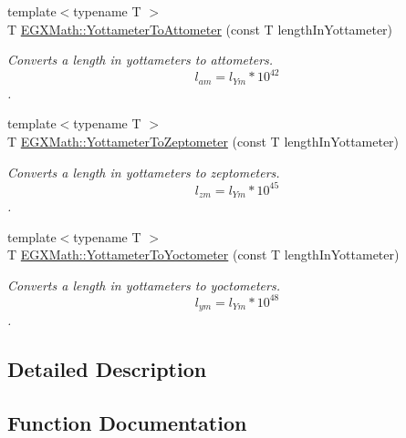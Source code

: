 \begin{DoxyCompactItemize}
{\footnotesize template$<$typename T $>$ }\\T \mbox{\hyperlink{group___e_g_x_math-_conversions-_length_conversions-_s_i-_yottameter-_s_i_gad04f66f8ca146161e2a36525bb887a5b}{E\+G\+X\+Math\+::\+Yottameter\+To\+Attometer}} (const T length\+In\+Yottameter)
\begin{DoxyCompactList}\small\item\em Converts a length in yottameters to attometers. \[ l_{am}=l_{Ym} * 10^{42} \]. \end{DoxyCompactList}\item 
{\footnotesize template$<$typename T $>$ }\\T \mbox{\hyperlink{group___e_g_x_math-_conversions-_length_conversions-_s_i-_yottameter-_s_i_ga976c591d436c20684f2d55461a05da3e}{E\+G\+X\+Math\+::\+Yottameter\+To\+Zeptometer}} (const T length\+In\+Yottameter)
\begin{DoxyCompactList}\small\item\em Converts a length in yottameters to zeptometers. \[ l_{zm}=l_{Ym} * 10^{45} \]. \end{DoxyCompactList}\item 
{\footnotesize template$<$typename T $>$ }\\T \mbox{\hyperlink{group___e_g_x_math-_conversions-_length_conversions-_s_i-_yottameter-_s_i_ga946a366f9c912aaa81ab052567f86bc2}{E\+G\+X\+Math\+::\+Yottameter\+To\+Yoctometer}} (const T length\+In\+Yottameter)
\begin{DoxyCompactList}\small\item\em Converts a length in yottameters to yoctometers. \[ l_{ym}=l_{Ym} * 10^{48} \]. \end{DoxyCompactList}\end{DoxyCompactItemize}


\subsection{Detailed Description}


\subsection{Function Documentation}
\mbox{\label{group___e_g_x_math-_conversions-_length_conversions-_s_i-_yottameter-_s_i_gad04f66f8ca146161e2a36525bb887a5b}} 
